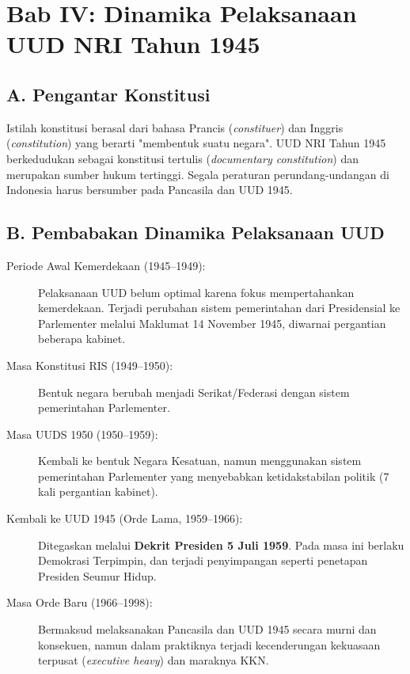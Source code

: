 \section{Bab IV: Dinamika Pelaksanaan UUD NRI Tahun 1945}
\subsection{A. Pengantar Konstitusi}
Istilah konstitusi berasal dari bahasa Prancis (\textit{constituer}) dan Inggris (\textit{constitution}) yang berarti "membentuk suatu negara". UUD NRI Tahun 1945 berkedudukan sebagai konstitusi tertulis (\textit{documentary constitution}) dan merupakan sumber hukum tertinggi. Segala peraturan perundang-undangan di Indonesia harus bersumber pada Pancasila dan UUD 1945.

\subsection{B. Pembabakan Dinamika Pelaksanaan UUD}
\begin{description}
    \item[Periode Awal Kemerdekaan (1945--1949):] Pelaksanaan UUD belum optimal karena fokus mempertahankan kemerdekaan. Terjadi perubahan sistem pemerintahan dari Presidensial ke Parlementer melalui Maklumat 14 November 1945, diwarnai pergantian beberapa kabinet.
    \item[Masa Konstitusi RIS (1949--1950):] Bentuk negara berubah menjadi Serikat/Federasi dengan sistem pemerintahan Parlementer.
    \item[Masa UUDS 1950 (1950--1959):] Kembali ke bentuk Negara Kesatuan, namun menggunakan sistem pemerintahan Parlementer yang menyebabkan ketidakstabilan politik (7 kali pergantian kabinet).
    \item[Kembali ke UUD 1945 (Orde Lama, 1959--1966):] Ditegaskan melalui \textbf{Dekrit Presiden 5 Juli 1959}. Pada masa ini berlaku Demokrasi Terpimpin, dan terjadi penyimpangan seperti penetapan Presiden Seumur Hidup.
    \item[Masa Orde Baru (1966--1998):] Bermaksud melaksanakan Pancasila dan UUD 1945 secara murni dan konsekuen, namun dalam praktiknya terjadi kecenderungan kekuasaan terpusat (\textit{executive heavy}) dan maraknya KKN.
\end{description}